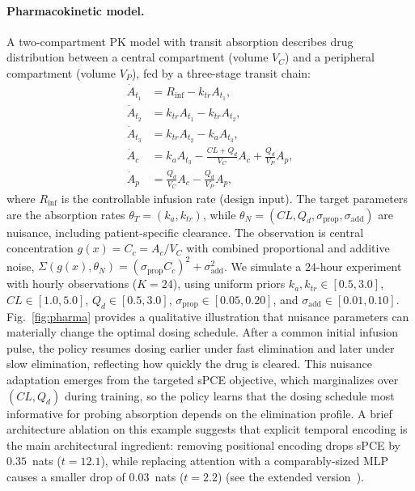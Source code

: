 \documentclass[conference]{IEEEtran}
\newif\ifextended
\begin{document}
\paragraph{Pharmacokinetic model.}
A two-compartment PK model with transit absorption describes drug distribution between a central compartment (volume $V_C$) and a peripheral compartment (volume $V_P$), fed by a three-stage transit chain:
\begin{equation}\label{eq:pk}
\begin{aligned}
\dot{A}_{t_1} &= R_\text{inf} - k_{tr} A_{t_1}, \\
\dot{A}_{t_2} &= k_{tr} A_{t_1} - k_{tr} A_{t_2}, \\
\dot{A}_{t_3} &= k_{tr} A_{t_2} - k_a A_{t_3}, \\
\dot{A}_c &= k_a A_{t_3} - \tfrac{CL + Q_d}{V_C} A_c + \tfrac{Q_d}{V_P} A_p, \\
\dot{A}_p &= \tfrac{Q_d}{V_C} A_c - \tfrac{Q_d}{V_P} A_p,
\end{aligned}
\end{equation}
where $R_\text{inf}$ is the controllable infusion rate (design input). The target parameters are the absorption rates $\theta_T = (k_a, k_{tr})$, while $\theta_N = (CL, Q_d, \sigma_{\text{prop}}, \sigma_{\text{add}})$ are nuisance, including patient-specific clearance. The observation is central concentration $g(x) = C_c = A_c/V_C$ with combined proportional and additive noise, $\Sigma(g(x), \theta_N) = (\sigma_{\text{prop}} C_c)^2 + \sigma_{\text{add}}^2$.
We simulate a 24-hour experiment with hourly observations ($K = 24$), using uniform priors $k_a, k_{tr} \in [0.5, 3.0]$, $CL \in [1.0, 5.0]$, $Q_d \in [0.5, 3.0]$, $\sigma_{\text{prop}} \in [0.05, 0.20]$, and $\sigma_{\text{add}} \in [0.01, 0.10]$.
Fig.~\ref{fig:pharma} provides a qualitative illustration that nuisance parameters can materially change the optimal dosing schedule. After a common initial infusion pulse, the policy resumes dosing earlier under fast elimination and later under slow elimination, reflecting how quickly the drug is cleared. This nuisance adaptation emerges from the targeted sPCE objective, which marginalizes over $(CL, Q_d)$ during training, so the policy learns that the dosing schedule most informative for probing absorption depends on the elimination profile.
A brief architecture ablation on this example suggests that explicit temporal encoding is the main architectural ingredient: removing positional encoding drops sPCE by $0.35$~nats ($t{=}12.1$), while replacing attention with a comparably-sized MLP causes a smaller drop of $0.03$~nats ($t{=}2.2$)\ifextended{} (Appendix~\ref{sec:ablation})\else{} (see the extended version~\cite{strouwen2026extended})\fi.
\end{document}
